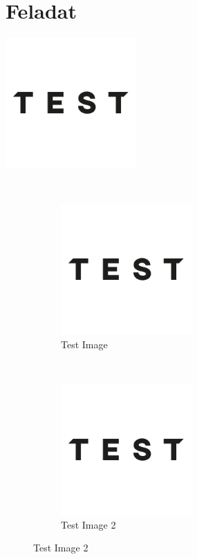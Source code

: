 \documentclass{article}
\begin{document}
	\section{Feladat}
		\includegraphics[height=5cm]{image1.png}
		
		\lipsum[1]\\
		\begin{figure}
			\label{figure_label}
			\begin{subfigure}{5cm}
				\label{fig:subfig1}
				\centering
				\caption{Test Image}
				\includegraphics[height=5cm]{image1.png}
			\end{subfigure}\\
			\begin{subfigure}{5cm}
				\label{fig:subfig2}
				\centering
				\caption{Test Image 2}
				\includegraphics[height=5cm, width=-5cm]{image1.png}
			\end{subfigure}
		\end{figure}
		\lipsum[1]
		
\end{document}
